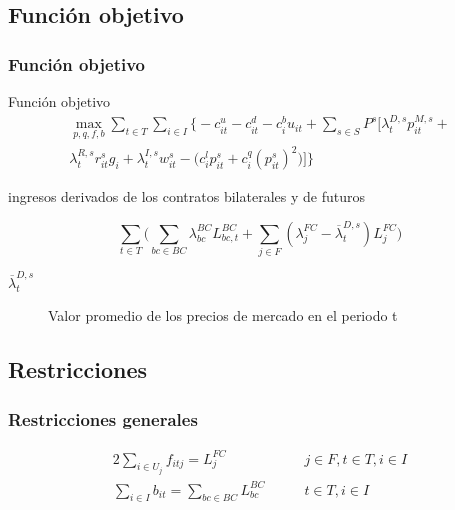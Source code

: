 \documentclass[xcolor=dvipsnames, utf8, spanish]{beamer} %
\begin{document}
\subsection{Función objetivo}

\begin{frame}
	\frametitle{Función objetivo}
	\begingroup
	\begin{block}{Función objetivo}
		\begin{align}
			\max_{p,q,f,b} \sum_{t \in T} \sum_{i \in I} \Big\{-c^{u}_{it}-c^{d}_{it}-c^{b}_{i}u_{it}+\sum_{s\in S}P^s \Big[ \lambda^{D,s}_t p^{M,s}_{it}+ \nonumber\\
			\lambda^{R,s}_t r^{s}_{it} g_i + \lambda^{I,s}_t w^{s}_{it}-\Big( c^l_i p^s_{it} + c^q_i ( p^s_{it})^2 \Big) \Big] \Big\} \label{eq:Fobj}
		\end{align}	
	\end{block}
	\endgroup
	\scriptsize
	\begin{center}
		ingresos derivados de los contratos bilaterales y de futuros
	\end{center}
	\begin{displaymath}
		\sum_{t\in T} \Big(  \sum_{bc \in BC} \lambda^{BC}_{bc} L^{BC}_{bc,t} + \sum_{j \in F} (\lambda^{FC}_j -\overline{\lambda}^{D,s}_t) L^{FC}_j \Big) 
	\end{displaymath}
	\begin{description}
		\item [$\overline{\lambda}^{D,s}_t$] Valor promedio de los precios de mercado en el periodo t
	\end{description}
\end{frame}


\subsection{Restricciones}

\begin{frame}
	\frametitle{Restricciones generales}
	\begin{alignat}{2}
		\sum_{i \in U_j} f_{itj} = L^{FC}_j  &\qquad j \in F,t \in T,i \in I \label{eq:Fini}  \\
		\sum_{i \in I} b_{it} = \sum_{bc \in BC} L^{BC}_{bc}  &\qquad t \in T,i \in I \label{eq:Ffin}
	\end{alignat}
\end{frame}
\end{document}
